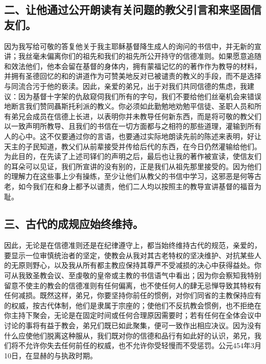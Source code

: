 
\subsection{二、让他通过公开朗读有关问题的教父引言和来坚固信友们。}

因为我写给可敬的答复他关于我主耶稣基督降生成人的询问的书信中，并无新的宣讲；我丝毫未偏离你们的祖先和我们的祖先所公开持守的信德准则。如果愿意追随和效法他们，他本会留在基督的身体内，拥有蒙福记忆的的著作作为教导的材料，并拥有圣德回忆的和的讲道作为可赞美地反对已被谴责的教义的手段，而不是选择与同流合污于他的亵渎。因此，亲爱的弟兄，出于对我们共同信德的焦虑，我建议：因为基督十字架的仇敌窥伺我们所有的字句，我们不要给他们丝毫机会来错误地断言我们赞同聶斯托利派的教义。你必须如此勤勉地劝勉平信徒、圣职人员和所有弟兄会成员在信德上长进，以表明你并未教导任何新东西，而是将可敬的教父们以一致声明所教导、且我们的书信在一切方面都与之相符的那些道理，灌输到所有人的心中。这不仅要通过你的言语，也要通过实际地朗读先前的陈述来表明，好让天主的子民知道，教父们从前辈接受并传给后代的东西，在今日仍然灌输给他们。为此目的，在先读了上述司铎们的声明之后，最后也让我的著作被宣读，使信友们的耳朵可以见证，我们所宣讲的没有别的，正是我们从祖先那里接受的。因为他们的理解力在这些事上少有操练，至少让他们从教父的书信中学习，这邪恶是何等古老，如今我们在和身上都予以谴责，他们二人均以按照主的教导宣讲基督的福音为耻。\par


\subsection{三、古代的成规应始终维持。}

因此，无论是在信德准则还是在纪律遵守上，都当始终维持古代的规范，亲爱的，要显示一位审慎统治者的坚定，使教会从我对其古老特权的坚决维护、对抗某些人的无原则野心，以及我从所有都主教应保持其尊严不受减损的决心中获得益处。你可从我致圣教会议、至虔敬的皇帝或主教的书信语气中看出；因为你会察知我特别留意不使主的教会的信德准则有任何偏离，也不使任何人的肆无忌惮导致其特权有任何减损。既然这样，弟兄，你要坚持你前任的惯例，对你们同省的主教保持应有的权威，按古代体制，他们是隶属于宗座的；使他们不反抗教会惯例，也不拒绝在你主持下聚会，无论是在固定时间或任何合理原因需要时；若有任何在全体会议中讨论的事将有益于教会，弟兄们既已如此聚集，便可一致作出相应决议。因为没有什么应使他们脱离这种服从，我们既对你的信德和品行有如此好的认识，弟兄，我们将不允许你失去任何前任的权威，也不允许你受轻慢而不受惩罚。公元454年3月10日，在显赫的与执政时期。\par

